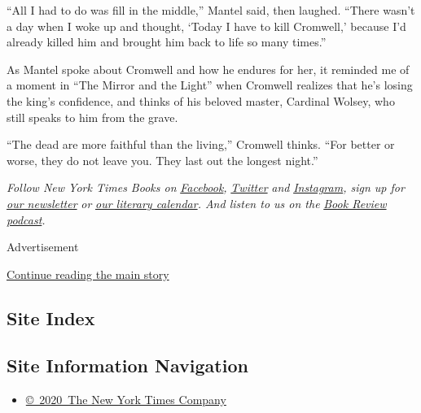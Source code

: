 ``All I had to do was fill in the middle,'' Mantel said, then laughed.
``There wasn't a day when I woke up and thought, `Today I have to kill
Cromwell,' because I'd already killed him and brought him back to life
so many times.''

As Mantel spoke about Cromwell and how he endures for her, it reminded
me of a moment in ``The Mirror and the Light'' when Cromwell realizes
that he's losing the king's confidence, and thinks of his beloved
master, Cardinal Wolsey, who still speaks to him from the grave.

``The dead are more faithful than the living,'' Cromwell thinks. ``For
better or worse, they do not leave you. They last out the longest
night.''

\emph{Follow New York Times Books on}
\href{https://www.facebook.com/nytbooks/}{\emph{Facebook}}\emph{,}
\href{https://twitter.com/nytimesbooks}{\emph{Twitter}} \emph{and}
\href{https://www.instagram.com/nytbooks/}{\emph{Instagram}}\emph{, sign
up for}
\href{https://www.nytimes.com/newsletters/books-review}{\emph{our
newsletter}} \emph{or}
\href{https://www.nytimes.com/interactive/2017/books/books-calendar.html}{\emph{our
literary calendar}}\emph{. And listen to us on the}
\href{https://www.nytimes.com/column/book-review-podcast}{\emph{Book
Review podcast}}\emph{.}

Advertisement

\protect\hyperlink{after-bottom}{Continue reading the main story}

\hypertarget{site-index}{%
\subsection{Site Index}\label{site-index}}

\hypertarget{site-information-navigation}{%
\subsection{Site Information
Navigation}\label{site-information-navigation}}

\begin{itemize}
\tightlist
\item
  \href{https://help.nytimes.com/hc/en-us/articles/115014792127-Copyright-notice}{©~2020~The
  New York Times Company}
\end{itemize}

